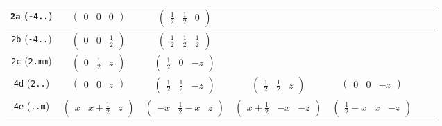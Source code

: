 \documentclass[fleqn,9pt,landscape]{jsarticle}
\begin{document}
\begin{center}
\begin{longtable}{ccccccc}
{\tt 2a} ({\tt -4..}) & $ \begin{pmatrix} 0 & 0 & 0 \end{pmatrix} $ & $ \begin{pmatrix} \frac{1}{2} & \frac{1}{2} & 0 \end{pmatrix} $ & $  $ & $  $ & $  $ & $  $ \\ \hline
{\tt 2b} ({\tt -4..}) & $ \begin{pmatrix} 0 & 0 & \frac{1}{2} \end{pmatrix} $ & $ \begin{pmatrix} \frac{1}{2} & \frac{1}{2} & \frac{1}{2} \end{pmatrix} $ & $  $ & $  $ & $  $ & $  $ \\ \hline
{\tt 2c} ({\tt 2.mm}) & $ \begin{pmatrix} 0 & \frac{1}{2} & z \end{pmatrix} $ & $ \begin{pmatrix} \frac{1}{2} & 0 & - z \end{pmatrix} $ & $  $ & $  $ & $  $ & $  $ \\ \hline
{\tt 4d} ({\tt 2..}) & $ \begin{pmatrix} 0 & 0 & z \end{pmatrix} $ & $ \begin{pmatrix} \frac{1}{2} & \frac{1}{2} & - z \end{pmatrix} $ & $ \begin{pmatrix} \frac{1}{2} & \frac{1}{2} & z \end{pmatrix} $ & $ \begin{pmatrix} 0 & 0 & - z \end{pmatrix} $ & $  $ & $  $ \\ \hline
{\tt 4e} ({\tt ..m}) & $ \begin{pmatrix} x & x + \frac{1}{2} & z \end{pmatrix} $ & $ \begin{pmatrix} - x & \frac{1}{2} - x & z \end{pmatrix} $ & $ \begin{pmatrix} x + \frac{1}{2} & - x & - z \end{pmatrix} $ & $ \begin{pmatrix} \frac{1}{2} - x & x & - z \end{pmatrix} $ & $  $ & $  $ \\ \hline

\end{longtable}
\end{center}
\end{document}
